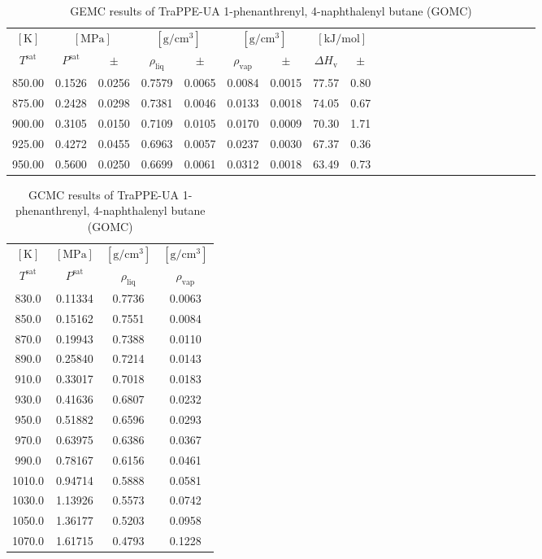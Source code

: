 \documentclass[%
 aip,
 jcp,
 sd,%
 amsmath,amssymb,
]{revtex4-1}
\begin{document}
\begin{table*}[]
\centering
\caption{
GEMC results of TraPPE-UA 1-phenanthrenyl, 4-naphthalenyl butane (GOMC)
}
\label{tab:TraPPE-1p4nB-GOMC-GEMC}
\begin{ruledtabular}
\begin{tabular}{ccccccccccccccccccccccc}
$[\mathrm{K}]$ & \multicolumn{2}{c}{$[\mathrm{MPa}]$} & \multicolumn{2}{c}{$[\mathrm{g/cm^3}]$} & \multicolumn{2}{c}{$[\mathrm{g/cm^3}]$} & \multicolumn{2}{c}{$[\mathrm{kJ/mol}]$} \\
$T^{\mathrm{sat}}$  & $P^{\mathrm{sat}}$ & $\pm$ & $\rho_{\mathrm{liq}}$ & $\pm$ & $\rho_{\mathrm{vap}}$ & $\pm$ & $\Delta H_{\mathrm{v}}$ & $\pm$
 \\
\hline		
850.00	&	0.1526	&	0.0256	&	0.7579	&	0.0065	&	0.0084	&	0.0015	&	77.57	&	0.80	\\
875.00	&	0.2428	&	0.0298	&	0.7381	&	0.0046	&	0.0133	&	0.0018	&	74.05	&	0.67	\\
900.00	&	0.3105	&	0.0150	&	0.7109	&	0.0105	&	0.0170	&	0.0009	&	70.30	&	1.71	\\
925.00	&	0.4272	&	0.0455	&	0.6963	&	0.0057	&	0.0237	&	0.0030	&	67.37	&	0.36	\\
950.00	&	0.5600	&	0.0250	&	0.6699	&	0.0061	&	0.0312	&	0.0018	&	63.49	&	0.73	\\
\end{tabular}
\end{ruledtabular}
\end{table*}

\begin{table*}[]
\centering
\caption{
GCMC results of TraPPE-UA 1-phenanthrenyl, 4-naphthalenyl butane (GOMC)
}
\label{tab:TraPPE-1p4nB-GOMC-GCMC}
\begin{tabular}{cccc}
\hline		
$[\mathrm{K}]$ & $[\mathrm{MPa}]$ & $[\mathrm{g/cm^3}]$ & $[\mathrm{g/cm^3}]$  \\
$T^{\mathrm{sat}}$  & $P^{\mathrm{sat}}$ & $\rho_{\mathrm{liq}}$ & $\rho_{\mathrm{vap}}$ \\
\hline		
830.0	&	0.11334	&	0.7736	&	0.0063	\\
850.0	&	0.15162	&	0.7551	&	0.0084	\\
870.0	&	0.19943	&	0.7388	&	0.0110	\\
890.0	&	0.25840	&	0.7214	&	0.0143	\\
910.0	&	0.33017	&	0.7018	&	0.0183	\\
930.0	&	0.41636	&	0.6807	&	0.0232	\\
950.0	&	0.51882	&	0.6596	&	0.0293	\\
970.0	&	0.63975	&	0.6386	&	0.0367	\\
990.0	&	0.78167	&	0.6156	&	0.0461	\\
1010.0	&	0.94714	&	0.5888	&	0.0581	\\
1030.0	&	1.13926	&	0.5573	&	0.0742	\\
1050.0	&	1.36177	&	0.5203	&	0.0958	\\
1070.0	&	1.61715	&	0.4793	&	0.1228	\\
\hline		
\end{tabular}
\end{table*}
\end{document}
